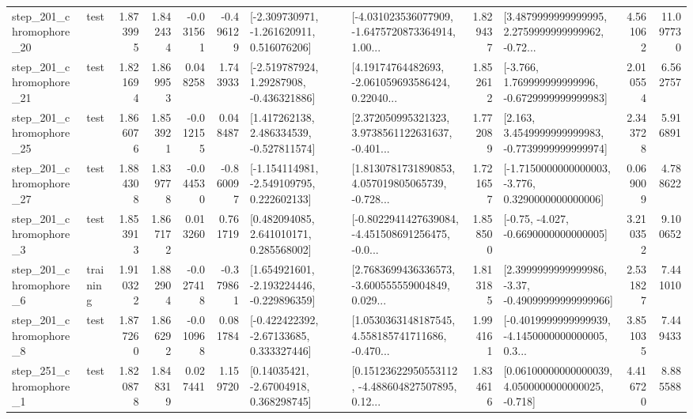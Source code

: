 \begin{tabular}{llrrrrllrlrr}
  step\_201\_chromophore\_20 &      test &      1.873995 &    1.842434 &     -0.031561 & -0.496129 &   [-2.309730971, -1.261620911, 0.516076206] &  [-4.031023536077909, -1.6475720873364914, 1.00... &       1.829437 &  [3.4879999999999995, 2.2759999999999962, -0.72... &            4.561062 &         11.097730 \\
  step\_201\_chromophore\_21 &      test &      1.821694 &    1.869953 &      0.048258 &  1.743933 &    [-2.519787924, 1.29287908, -0.436321886] &  [4.19174764482693, -2.061059693586424, 0.22040... &       1.852612 &   [-3.766, 1.769999999999996, -0.6729999999999983] &            2.010554 &          6.562757 \\
  step\_201\_chromophore\_25 &      test &      1.866076 &    1.853921 &     -0.012155 &  0.048487 &    [1.417262138, 2.486334539, -0.527811574] &  [2.372050995321323, 3.9738561122631637, -0.401... &       1.772089 &   [2.163, 3.4549999999999983, -0.7739999999999974] &            2.343728 &          5.916891 \\
  step\_201\_chromophore\_27 &      test &      1.884308 &    1.839778 &     -0.044530 & -0.860097 &   [-1.154114981, -2.549109795, 0.222602133] &  [1.8130781731890853, 4.057019805065739, -0.728... &       1.721657 &  [-1.7150000000000003, -3.776, 0.3290000000000006] &            0.069009 &          4.788622 \\
   step\_201\_chromophore\_3 &      test &      1.853913 &    1.867172 &      0.013260 &  0.761719 &     [0.482094085, 2.641010171, 0.285568002] &  [-0.8022941427639084, -4.451508691256475, -0.0... &       1.858500 &               [-0.75, -4.027, -0.6690000000000005] &            3.210352 &          9.100652 \\
   step\_201\_chromophore\_6 &  training &      1.910322 &    1.882904 &     -0.027418 & -0.379861 &   [1.654921601, -2.193224446, -0.229896359] &  [2.7683699436336573, -3.600555559004849, 0.029... &       1.813185 &  [2.3999999999999986, -3.37, -0.49099999999999966] &            2.531827 &          7.441010 \\
   step\_201\_chromophore\_8 &      test &      1.877260 &    1.866292 &     -0.010968 &  0.081784 &    [-0.422422392, -2.67133685, 0.333327446] &  [1.0530363148187545, 4.558185741711686, -0.470... &       1.994161 &  [-0.4019999999999939, -4.1450000000000005, 0.3... &            3.851035 &          7.449433 \\
   step\_251\_chromophore\_1 &      test &      1.820878 &    1.848319 &      0.027441 &  1.159720 &      [0.14035421, -2.67004918, 0.368298745] &  [0.15123622950553112, -4.488604827507895, 0.12... &       1.834616 &  [0.06100000000000039, 4.0500000000000025, -0.718] &            4.416720 &          8.885588 \\

\end{tabular}
